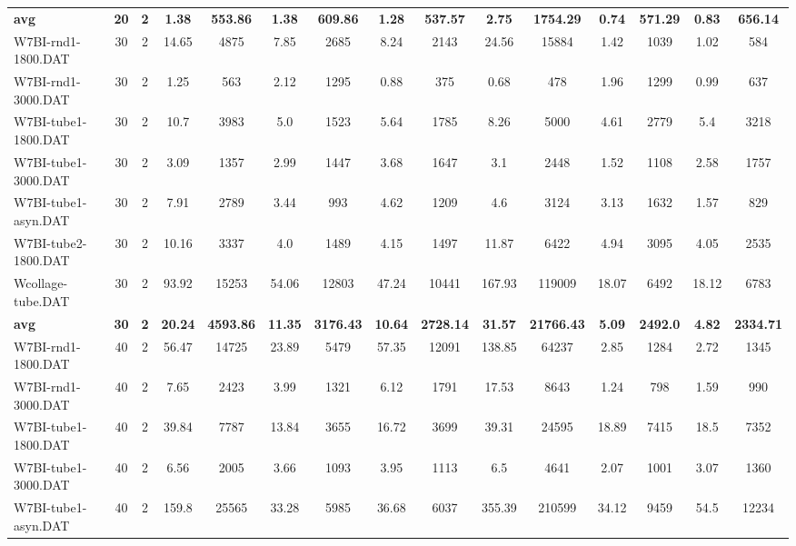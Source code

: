 \begin{table}[!ht]
{\begin{tabular}{lcccccccccccccc}
\cline{1-15} \textbf{avg} & \textbf{20} & \textbf{2} & \textbf{1.38} & \textbf{553.86} & \textbf{1.38} & \textbf{609.86} & \textbf{1.28} & \textbf{537.57} & \textbf{2.75} & \textbf{1754.29} & \textbf{0.74} & \textbf{571.29} & \textbf{0.83} & \textbf{656.14} \\ \cline{1-15}
W7BI-rnd1-1800.DAT & 30 & 2 & 14.65 & 4875 & 7.85 & 2685 & 8.24 & 2143 & 24.56 & 15884 & 1.42 & 1039 &  \textcolor{blue2}{1.02} & 584 \\
W7BI-rnd1-3000.DAT & 30 & 2 & 1.25 & 563 & 2.12 & 1295 & 0.88 & 375 &  \textcolor{blue2}{0.68} & 478 & 1.96 & 1299 & 0.99 & 637 \\
W7BI-tube1-1800.DAT & 30 & 2 & 10.7 & 3983 & 5.0 & 1523 & 5.64 & 1785 & 8.26 & 5000 &  \textcolor{blue2}{4.61} & 2779 & 5.4 & 3218 \\
W7BI-tube1-3000.DAT & 30 & 2 & 3.09 & 1357 & 2.99 & 1447 & 3.68 & 1647 & 3.1 & 2448 &  \textcolor{blue2}{1.52} & 1108 & 2.58 & 1757 \\
W7BI-tube1-asyn.DAT & 30 & 2 & 7.91 & 2789 & 3.44 & 993 & 4.62 & 1209 & 4.6 & 3124 & 3.13 & 1632 &  \textcolor{blue2}{1.57} & 829 \\
W7BI-tube2-1800.DAT & 30 & 2 & 10.16 & 3337 &  \textcolor{blue2}{4.0} & 1489 & 4.15 & 1497 & 11.87 & 6422 & 4.94 & 3095 & 4.05 & 2535 \\
Wcollage-tube.DAT & 30 & 2 & 93.92 & 15253 & 54.06 & 12803 & 47.24 & 10441 & 167.93 & 119009 &  \textcolor{blue2}{18.07} & 6492 & 18.12 & 6783 \\
\cline{1-15} \textbf{avg} & \textbf{30} & \textbf{2} & \textbf{20.24} & \textbf{4593.86} & \textbf{11.35} & \textbf{3176.43} & \textbf{10.64} & \textbf{2728.14} & \textbf{31.57} & \textbf{21766.43} & \textbf{5.09} & \textbf{2492.0} & \textbf{4.82} & \textbf{2334.71} \\ \cline{1-15}
W7BI-rnd1-1800.DAT & 40 & 2 & 56.47 & 14725 & 23.89 & 5479 & 57.35 & 12091 & 138.85 & 64237 & 2.85 & 1284 &  \textcolor{blue2}{2.72} & 1345 \\
W7BI-rnd1-3000.DAT & 40 & 2 & 7.65 & 2423 & 3.99 & 1321 & 6.12 & 1791 & 17.53 & 8643 &  \textcolor{blue2}{1.24} & 798 & 1.59 & 990 \\
W7BI-tube1-1800.DAT & 40 & 2 & 39.84 & 7787 &  \textcolor{blue2}{13.84} & 3655 & 16.72 & 3699 & 39.31 & 24595 & 18.89 & 7415 & 18.5 & 7352 \\
W7BI-tube1-3000.DAT & 40 & 2 & 6.56 & 2005 & 3.66 & 1093 & 3.95 & 1113 & 6.5 & 4641 &  \textcolor{blue2}{2.07} & 1001 & 3.07 & 1360 \\
W7BI-tube1-asyn.DAT & 40 & 2 & 159.8 & 25565 &  \textcolor{blue2}{33.28} & 5985 & 36.68 & 6037 & 355.39 & 210599 & 34.12 & 9459 & 54.5 & 12234 \\

\end{tabular}}
\end{table}
